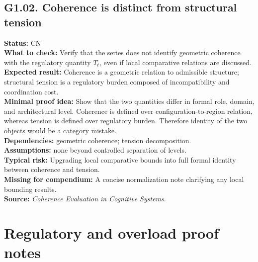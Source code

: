 \documentclass[12pt]{article}
\begin{document}
	\subsection*{G1.02. Coherence is distinct from structural tension}
	\textbf{Status:} CN \\
	\textbf{What to check:} Verify that the series does not identify geometric coherence with the regulatory quantity $T_t$, even if local comparative relations are discussed. \\
	\textbf{Expected result:} Coherence is a geometric relation to admissible structure; structural tension is a regulatory burden composed of incompatibility and coordination cost. \\
	\textbf{Minimal proof idea:} Show that the two quantities differ in formal role, domain, and architectural level. Coherence is defined over configuration-to-region relation, whereas tension is defined over regulatory burden. Therefore identity of the two objects would be a category mistake. \\
	\textbf{Dependencies:} geometric coherence; tension decomposition. \\
	\textbf{Assumptions:} none beyond controlled separation of levels. \\
	\textbf{Typical risk:} Upgrading local comparative bounds into full formal identity between coherence and tension. \\
	\textbf{Missing for compendium:} A concise normalization note clarifying any local bounding results. \\
	\textbf{Source:} \emph{Coherence Evaluation in Cognitive Systems}.
	
	\section{Regulatory and overload proof notes}
	
\end{document}
